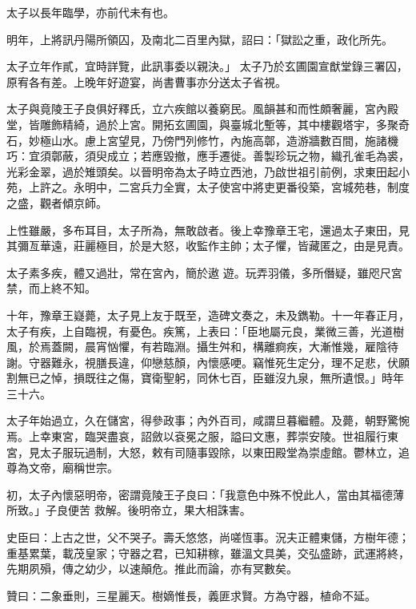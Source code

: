 \begin{pinyinscope}
 太子以長年臨學，亦前代未有也。



 明年，上將訊丹陽所領囚，及南北二百里內獄，詔曰：「獄訟之重，政化所先。



 太子立年作貳，宜時詳覽，此訊事委以親決。」
 太子乃於玄圃園宣猷堂錄三署囚，原宥各有差。上晚年好遊宴，尚書曹事亦分送太子省視。



 太子與竟陵王子良俱好釋氏，立六疾館以養窮民。風韻甚和而性頗奢麗，宮內殿堂，皆雕飾精綺，過於上宮。開拓玄圃園，與臺城北塹等，其中樓觀塔宇，多聚奇石，妙極山水。慮上宮望見，乃傍門列修竹，內施高鄣，造游牆數百間，施諸機巧：宜須鄣蔽，須臾成立；若應毀撤，應手遷徙。善製珍玩之物，織孔雀毛為裘，光彩金翠，過於雉頭矣。以晉明帝為太子時立西池，乃啟世祖引前例，求東田起小苑，上許之。永明中，二宮兵力全實，太子使宮中將吏更番役築，宮城苑巷，制度之盛，觀者傾京師。



 上性雖嚴，多布耳目，太子所為，無敢啟者。後上幸豫章王宅，還過太子東田，見其彌亙華遠，莊麗極目，於是大怒，收監作主帥；太子懼，皆藏匿之，由是見責。



 太子素多疾，體又過壯，常在宮內，簡於遨
 遊。玩弄羽儀，多所僭疑，雖咫尺宮禁，而上終不知。



 十年，豫章王嶷薨，太子見上友于既至，造碑文奏之，未及鐫勒。十一年春正月，太子有疾，上自臨視，有憂色。疾篤，上表曰：「臣地屬元良，業微三善，光道樹風，於焉蓋闕，晨宵忷懼，有若臨淵。攝生舛和，構離痾疾，大漸惟幾，雇陰待謝。守器難永，視膳長違，仰戀慈顏，內懷感哽。竊惟死生定分，理不足悲，伏願割無已之悼，損既往之傷，寶衛聖躬，同休七百，臣雖沒九泉，無所遺恨。」時年三十六。



 太子年始過立，久在儲宮，得參政事；內外百司，咸謂旦暮繼體。及薨，朝野驚惋焉。上幸東宮，臨哭盡哀，詔斂以袞冕之服，謚曰文惠，葬崇安陵。世祖履行東宮，見太子服玩過制，大怒，敕有司隨事毀除，以東田殿堂為崇虛館。鬱林立，追尊為文帝，廟稱世宗。



 初，太子內懷惡明帝，密謂竟陵王子良曰：「我意色中殊不悅此人，當由其福德薄所致。」子良便苦
 救解。後明帝立，果大相誅害。



 史臣曰：上古之世，父不哭子。壽夭悠悠，尚嗟恆事。況夫正體東儲，方樹年德；重基累葉，載茂皇家；守器之君，已知耕稼，雖溫文具美，交弘盛跡，武運將終，先期夙殞，傳之幼少，以速顛危。推此而論，亦有冥數矣。



 贊曰：二象垂則，三星麗天。樹嫡惟長，義匪求賢。方為守器，植命不延。



\end{pinyinscope}